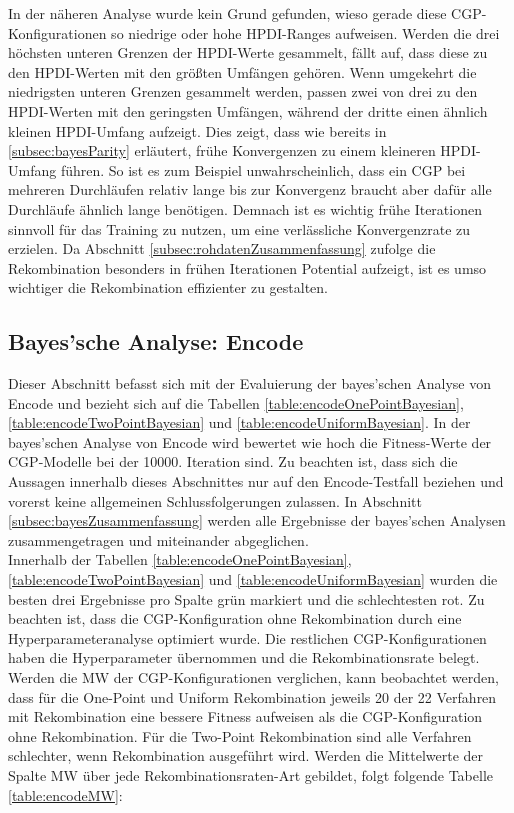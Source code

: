 In der näheren Analyse wurde kein Grund gefunden, wieso gerade diese CGP-Konfigurationen so niedrige oder hohe HPDI-Ranges aufweisen. 
Werden die drei höchsten unteren Grenzen der HPDI-Werte gesammelt, fällt auf, dass diese zu den HPDI-Werten mit den größten Umfängen gehören.
Wenn umgekehrt die niedrigsten unteren Grenzen gesammelt werden, passen zwei von drei zu den HPDI-Werten mit den geringsten Umfängen, während der dritte einen ähnlich kleinen HPDI-Umfang aufzeigt.
Dies zeigt, dass wie bereits in \ref{subsec:bayesParity} erläutert, frühe Konvergenzen zu einem kleineren HPDI-Umfang führen.
So ist es zum Beispiel unwahrscheinlich, dass ein CGP bei mehreren Durchläufen relativ lange bis zur Konvergenz braucht aber dafür alle Durchläufe ähnlich lange benötigen.
Demnach ist es wichtig frühe Iterationen sinnvoll für das Training zu nutzen, um eine verlässliche Konvergenzrate zu erzielen.
Da Abschnitt \ref{subsec:rohdatenZusammenfassung} zufolge die Rekombination besonders in frühen Iterationen Potential aufzeigt, ist es umso wichtiger die Rekombination effizienter zu gestalten.


\subsection{Bayes'sche Analyse: Encode}
\label{subsec:bayesEncode}

Dieser Abschnitt befasst sich mit der Evaluierung der bayes'schen Analyse von Encode und bezieht sich auf die Tabellen \ref{table:encodeOnePointBayesian}, \ref{table:encodeTwoPointBayesian} und \ref{table:encodeUniformBayesian}.
In der bayes'schen Analyse von Encode wird bewertet wie hoch die Fitness-Werte der CGP-Modelle bei der 10000. Iteration sind.
Zu beachten ist, dass sich die Aussagen innerhalb dieses Abschnittes nur auf den Encode-Testfall beziehen und vorerst keine allgemeinen Schlussfolgerungen zulassen.
In Abschnitt \ref{subsec:bayesZusammenfassung} werden alle Ergebnisse der bayes'schen Analysen zusammengetragen und miteinander abgeglichen.\\
Innerhalb der Tabellen \ref{table:encodeOnePointBayesian}, \ref{table:encodeTwoPointBayesian} und \ref{table:encodeUniformBayesian} wurden die besten drei Ergebnisse pro Spalte grün markiert und die schlechtesten rot.
Zu beachten ist, dass die CGP-Konfiguration ohne Rekombination durch eine Hyperparameteranalyse optimiert wurde.
Die restlichen CGP-Konfigurationen haben die Hyperparameter übernommen und die Rekombinationsrate belegt.\\
Werden die MW der CGP-Konfigurationen verglichen, kann beobachtet werden, dass für die One-Point und Uniform Rekombination jeweils 20 der 22 Verfahren mit Rekombination eine bessere Fitness aufweisen als die CGP-Konfiguration ohne Rekombination.
Für die Two-Point Rekombination sind alle Verfahren schlechter, wenn Rekombination ausgeführt wird.
Werden die Mittelwerte der Spalte MW über jede Rekombinationsraten-Art gebildet, folgt folgende Tabelle \ref{table:encodeMW}:

